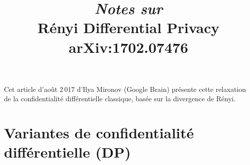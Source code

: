\documentclass[a4paper,11pt]{article} %
\title{\emph{Notes sur}\\\textbf{Rényi Differential Privacy}\\\small{arXiv:1702.07476}}
\author{}
\date{}
\begin{document}
\maketitle


Cet article d'août $2\,017$ d'Ilya Mironov (Google Brain) présente cette relaxation de la confidentialité différentielle \og classique\fg{}, basée sur la divergence de Rényi.
\section{Variantes de confidentialité différentielle (DP)}
\end{document}
